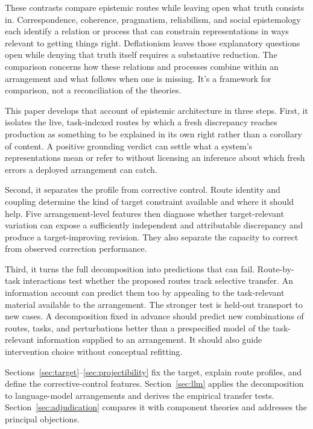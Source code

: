 \documentclass[12pt]{article}
\begin{document}
These contrasts compare epistemic routes while leaving open what truth consists in.
Correspondence, coherence, pragmatism, reliabilism, and social epistemology each identify a
relation or process that can constrain representations in ways relevant to getting things
right. Deflationism leaves those
explanatory questions open while denying that truth itself requires a substantive
reduction. The comparison concerns how these relations and processes combine within an
arrangement and what follows when one is missing. It's a framework for comparison, not a
reconciliation of the theories.

This paper develops that account of epistemic architecture in three steps. First, it isolates the
live, task-indexed routes by which a fresh discrepancy reaches production as something to
be explained in its own right rather than a corollary of content. A positive grounding verdict can
settle what a system's representations mean or refer to without licensing an inference
about which fresh errors a deployed arrangement can catch.

Second, it separates the profile from corrective control. Route identity and coupling
determine the kind of target constraint available and where it should help. Five
arrangement-level features then diagnose whether target-relevant variation can expose a
sufficiently independent and attributable discrepancy and produce a target-improving
revision. They also separate the capacity to correct from observed correction performance.

Third, it turns the full decomposition into predictions that can fail. Route-by-task
interactions test whether the proposed routes track selective transfer. An information
account can predict them too by appealing to the task-relevant material available to the
arrangement. The stronger test is held-out transport to new cases. A decomposition
fixed in advance should predict new combinations of routes, tasks, and perturbations better
than a prespecified model of the task-relevant information supplied to an arrangement. It
should also guide intervention choice without conceptual refitting.

Sections~\ref{sec:target}--\ref{sec:projectibility} fix the target, explain route profiles,
and define the corrective-control features. Section~\ref{sec:llm} applies the decomposition
to language-model arrangements and derives the empirical transfer tests.
Section~\ref{sec:adjudication} compares it with component theories and addresses the
principal objections.
\end{document}

